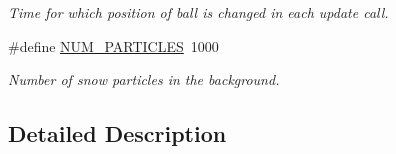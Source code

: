 \begin{DoxyCompactItemize}
\begin{DoxyCompactList}\small\item\em Time for which position of ball is changed in each update call. \end{DoxyCompactList}\item 
\hypertarget{group___d_e_f_i_n_e_ga75cbc112dce4b21c13fe7bb671accab1}{\#define \hyperlink{group___d_e_f_i_n_e_ga75cbc112dce4b21c13fe7bb671accab1}{N\-U\-M\-\_\-\-P\-A\-R\-T\-I\-C\-L\-E\-S}~1000}\label{group___d_e_f_i_n_e_ga75cbc112dce4b21c13fe7bb671accab1}

\begin{DoxyCompactList}\small\item\em Number of snow particles in the background. \end{DoxyCompactList}\end{DoxyCompactItemize}


\subsection{Detailed Description}
